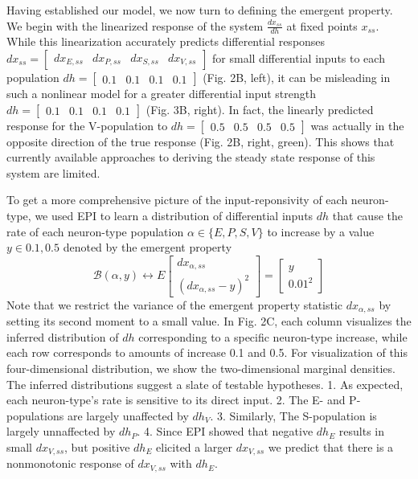 \documentclass[11pt]{article}
\begin{document}
Having established our model, we now turn to defining the emergent property. We begin with the linearized response of the system $\frac{dx_{ss}}{dh}$ at fixed points $x_{ss}$. 
While this linearization accurately predicts differential responses $dx_{ss} = \begin{bmatrix} dx_{E,ss} & dx_{P,ss} & dx_{S,ss} & dx_{V,ss} \end{bmatrix}$  for small differential inputs to each population $dh = \begin{bmatrix} 0.1 & 0.1 & 0.1 & 0.1 \end{bmatrix}$ (Fig. 2B, left), it can be misleading in such a nonlinear model for a greater differential input strength $dh = \begin{bmatrix} 0.1 & 0.1 & 0.1 & 0.1 \end{bmatrix}$ (Fig. 3B, right). In fact, the linearly predicted response for the V-population to $dh = \begin{bmatrix} 0.5 & 0.5 & 0.5 & 0.5 \end{bmatrix}$ was actually in the opposite direction of the true response (Fig. 2B, right, green).  This shows that currently available approaches  to deriving the steady state response of this system are limited.

To get a more comprehensive picture of the input-reponsivity of each neuron-type, we used EPI to learn a distribution of differential inputs $dh$ that cause the rate of each neuron-type population $\alpha \in \{E, P, S, V \}$ to increase by a value $y \in {0.1, 0.5}$ denoted by the emergent property 
\begin{equation}
\mathcal{B}(\alpha, y) \leftrightarrow 
E \begin{bmatrix} dx_{\alpha,ss} \\ (dx_{\alpha,ss} - y)^2 \end{bmatrix} = \begin{bmatrix} y \\ 0.01^2 \end{bmatrix}
\end{equation}
Note that we restrict the variance of the emergent property statistic $dx_{\alpha,ss}$ by setting its second moment to a small value. In Fig. 2C, each column visualizes the inferred distribution of $dh$ corresponding to a specific neuron-type increase, while each row corresponds to amounts of increase 0.1 and 0.5. For visualization of this four-dimensional distribution, we show the two-dimensional marginal densities.  The inferred distributions suggest a slate of testable hypotheses. 1. As expected, each neuron-type's rate is sensitive to its direct input.  2. The E- and P-populations are largely unaffected by $dh_V$. 3. Similarly, The S-population is largely unnaffected by $dh_P$. 4. Since EPI showed that negative $dh_E$ results in small $dx_{V,ss}$, but positive $dh_E$ elicited a larger $dx_{V,ss}$ we predict that there is a nonmonotonic response of $dx_{V,ss}$ with $dh_{E}$.
\end{document}
